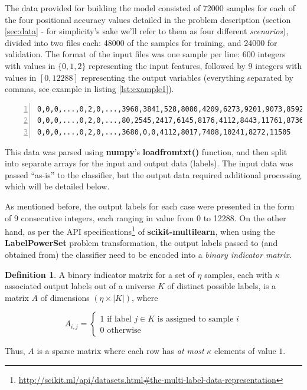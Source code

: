 \documentclass{kthreport}
\theoremstyle{definition}
\newtheorem{definition}{Definition}
\begin{document}
The data provided for building the model consisted of \num{72000} samples for each of the four positional accuracy values detailed in the problem description (section \ref{sec:data} - for simplicity's sake we'll refer to them as four different \emph{scenarios}), divided into two files each: \num{48000} of the samples for training, and \num{24 000} for validation. The format of the input files was one sample per line: \num{600} integers with values in $\{0, 1, 2\}$ representing the input features, followed by \num{9} integers with values in $[0, 12288]$ representing the output variables (everything separated by commas, see example in listing \ref{lst:example1}).

\begin{lstlisting}[captionpos=b,
				basicstyle={\small\ttfamily},
				numbers=left, 
				numberstyle=\tiny\color{gray},
				caption={Abbreviated example of input samples.},
                label={lst:example1}]
0,0,0,...,0,2,0,...,3968,3841,528,8080,4209,6273,9201,9073,8592
0,0,0,...,0,2,0,...,80,2545,2417,6145,8176,4112,8443,11761,8736
0,0,0,...,0,2,0,...,3680,0,0,4112,8017,7408,10241,8272,11505
\end{lstlisting}

This data was parsed using \textbf{numpy}'s \textbf{loadfromtxt()} function, and then split into separate arrays for the input and output data (labels). The input data was passed ``as-is'' to the classifier, but the output data required additional processing which will be detailed below.


As mentioned before, the output labels for each case were presented in the form of \num{9} consecutive integers, each ranging in value from \num{0} to \num{12288}. On the other hand, as per the API specifications\footnote{\url{http://scikit.ml/api/datasets.html#the-multi-label-data-representation}} of \textbf{scikit-multilearn}, when using the \textbf{LabelPowerSet} problem transformation, the output labels passed to (and obtained from) the classifier need to be encoded into a \emph{binary indicator matrix}. 

\begin{definition}
	A binary indicator matrix for a set of $\eta$ samples, each with $\kappa$ associated output labels out of a universe $K$ of distinct possible labels, is a matrix $A$ of dimensions $(\eta \times |K|)$, where
	
    \begin{equation}
    	A_{i,j} = \begin{cases}
    	1 \text{ if label } j \in K \text{ is assigned to sample } i \\
    	0 \text{ otherwise }
    	\end{cases}
    \end{equation}
	
	Thus, $A$ is a sparse matrix where each row has \emph{at most} $\kappa$ elements of value $1$.
\end{definition}
\end{document}

